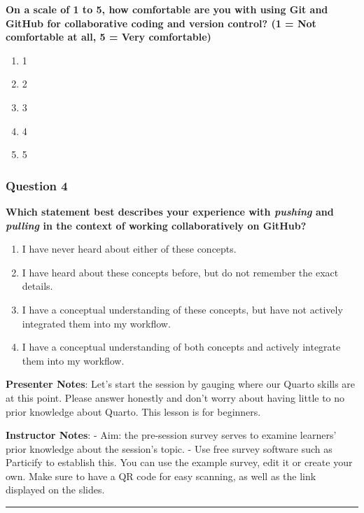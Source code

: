 \documentclass[
  letterpaper,
  DIV=11,
  numbers=noendperiod]{scrartcl}
\begin{document}
\textbf{On a scale of 1 to 5, how comfortable are you with using Git and
GitHub for collaborative coding and version control? (1 = Not
comfortable at all, 5 = Very comfortable)}

\begin{enumerate}
\def\labelenumi{\alph{enumi}.}
\item
  1
\item
  2
\item
  3
\item
  4
\item
  5
\end{enumerate}

\subsubsection{Question 4}

\textbf{Which statement best describes your experience with
\emph{pushing} and \emph{pulling} in the context of working
collaboratively on GitHub?}

\begin{enumerate}
\def\labelenumi{\alph{enumi}.}
\item
  I have never heard about either of these concepts.
\item
  I have heard about these concepts before, but do not remember the
  exact details.
\item
  I have a conceptual understanding of these concepts, but have not
  actively integrated them into my workflow.
\item
  I have a conceptual understanding of both concepts and actively
  integrate them into my workflow.
\end{enumerate}

\textbf{Presenter Notes}: Let's start the session by gauging where our
Quarto skills are at this point. Please answer honestly and don't worry
about having little to no prior knowledge about Quarto. This lesson is
for beginners.

\textbf{Instructor Notes}: - Aim: the pre-session survey serves to
examine learners' prior knowledge about the session's topic. - Use free
survey software such as Particify to establish this. You can use the
example survey, edit it or create your own. Make sure to have a QR code
for easy scanning, as well as the link displayed on the slides.

\begin{center}\rule{0.5\linewidth}{0.5pt}\end{center}
\end{document}
